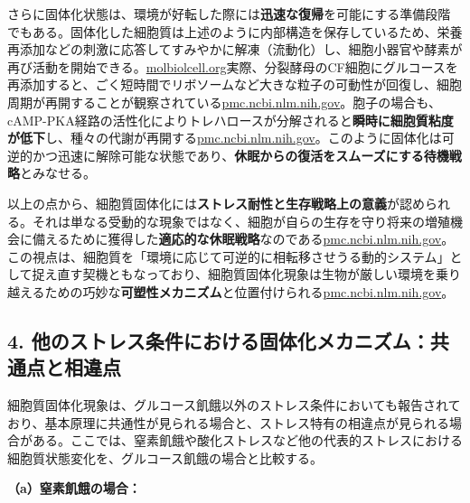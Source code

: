さらに固体化状態は、環境が好転した際には\textbf{迅速な復帰}を可能にする準備段階でもある。固体化した細胞質は上述のように内部構造を保存しているため、栄養再添加などの刺激に応答してすみやかに解凍（流動化）し、細胞小器官や酵素が再び活動を開始できる。\href{https://www.molbiolcell.org/doi/10.1091/mbc.E20-02-0125\#:~:text=All\%20these\%20cellular\%20rearrangements\%20result,favorable\%20environmental\%20conditions\%20are\%20restored}{molbiolcell.org}実際、分裂酵母のCF細胞にグルコースを再添加すると、ごく短時間でリボソームなど大きな粒子の可動性が回復し、細胞周期が再開することが観察されている\href{https://pmc.ncbi.nlm.nih.gov/articles/PMC11214080/\#:~:text=cytoplasmic\%20properties,the\%20spore\%20cytoplasm\%20impedes\%20the}{pmc.ncbi.nlm.nih.gov}。胞子の場合も、cAMP-PKA経路の活性化によりトレハロースが分解されると\textbf{瞬時に細胞質粘度が低下}し、種々の代謝が再開する\href{https://pmc.ncbi.nlm.nih.gov/articles/PMC11214080/\#:~:text=cytoplasmic\%20properties,of\%20diffusion\%20coefficients\%20with\%20tracer}{pmc.ncbi.nlm.nih.gov}。このように固体化は可逆的かつ迅速に解除可能な状態であり、\textbf{休眠からの復活をスムーズにする待機戦略}とみなせる。

以上の点から、細胞質固体化には\textbf{ストレス耐性と生存戦略上の意義}が認められる。それは単なる受動的な現象ではなく、細胞が自らの生存を守り将来の増殖機会に備えるために獲得した\textbf{適応的な休眠戦略}なのである\href{https://pmc.ncbi.nlm.nih.gov/articles/PMC4850707/\#:~:text=widespread\%20macromolecular\%20assembly\%20of\%20proteins,like\%20state}{pmc.ncbi.nlm.nih.gov}。この視点は、細胞質を「環境に応じて可逆的に相転移させうる動的システム」として捉え直す契機ともなっており、細胞質固体化現象は生物が厳しい環境を乗り越えるための巧妙な\textbf{可塑性メカニズム}と位置付けられる\href{https://pmc.ncbi.nlm.nih.gov/articles/PMC4850707/\#:~:text=cytoplasm\%20to\%20a\%20solid,like\%20state}{pmc.ncbi.nlm.nih.gov}。

\subsection{4. 他のストレス条件における固体化メカニズム：共通点と相違点}

細胞質固体化現象は、グルコース飢餓以外のストレス条件においても報告されており、基本原理に共通性が見られる場合と、ストレス特有の相違点が見られる場合がある。ここでは、窒素飢餓や酸化ストレスなど他の代表的ストレスにおける細胞質状態変化を、グルコース飢餓の場合と比較する。

\textbf{（a）窒素飢餓の場合：}

